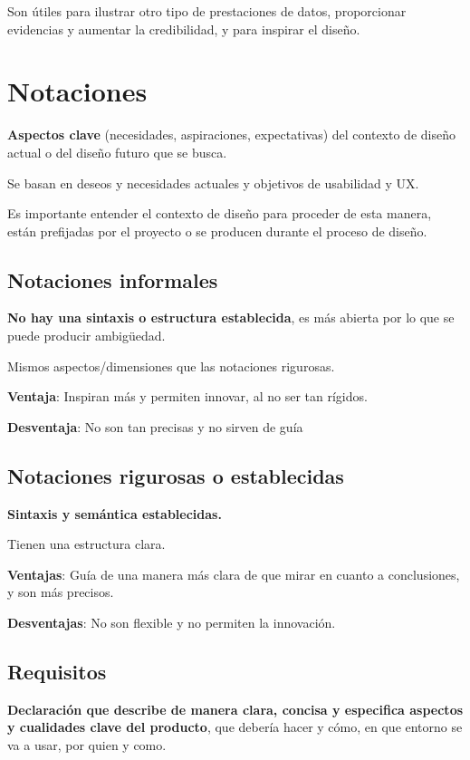 \documentclass[12pt]{report} %
\begin{document}
Son útiles para ilustrar otro tipo de prestaciones de datos,
proporcionar evidencias y aumentar la credibilidad, y para inspirar el
diseño.

\section{Notaciones}

\textbf{Aspectos clave} (necesidades, aspiraciones, expectativas) del
contexto de diseño actual o del diseño futuro que se busca.

Se basan en deseos y necesidades actuales y objetivos de usabilidad y
UX.

Es importante entender el contexto de diseño para proceder de esta
manera, están prefijadas por el proyecto o se producen durante el
proceso de diseño.

\subsection{Notaciones informales}

\textbf{No hay una sintaxis o estructura establecida}, es más abierta
por lo que se puede producir ambigüedad.

Mismos aspectos/dimensiones que las notaciones rigurosas.

\textbf{Ventaja}: Inspiran más y permiten innovar, al no ser tan
rígidos.

\textbf{Desventaja}: No son tan precisas y no sirven de guía

\subsection{Notaciones rigurosas o establecidas}

\textbf{Sintaxis y semántica establecidas.}

Tienen una estructura clara.

\textbf{Ventajas}: Guía de una manera más clara de que mirar en cuanto a
conclusiones, y son más precisos.

\textbf{Desventajas}: No son flexible y no permiten la innovación.

\subsection{Requisitos}

\textbf{Declaración que describe de manera clara, concisa y especifica
aspectos y cualidades clave del producto}, que debería hacer y cómo, en
que entorno se va a usar, por quien y como.
\end{document}

